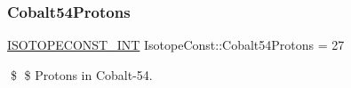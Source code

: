 \subsubsection{\texorpdfstring{Cobalt54\+Protons}{Cobalt54Protons}}
{\footnotesize\ttfamily \mbox{\hyperlink{group___isotope_const-_macros_ga5f18360b3e99483a35c32d789e62621c}{I\+S\+O\+T\+O\+P\+E\+C\+O\+N\+S\+T\+\_\+\+I\+NT}} Isotope\+Const\+::\+Cobalt54\+Protons = 27}

\$ \$ Protons in Cobalt-\/54. 